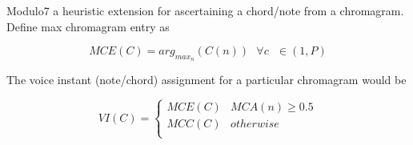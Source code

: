 \noindent Modulo7 a heuristic extension for ascertaining a chord/note from a chromagram. Define max chromagram entry as 

\begin{equation}
MCE(C) = arg_{max_n}(C(n)) \ \ \ \forall c \ \ \ \in (1, P)
\end{equation}

\noindent The voice instant (note/chord) assignment for a particular chromagram would be 

\begin{equation}
VI(C) = \begin{cases}
      MCE(C) & MCA(n) \geq 0.5 \\
      MCC(C) & otherwise \\  \end{cases}
\end{equation}

